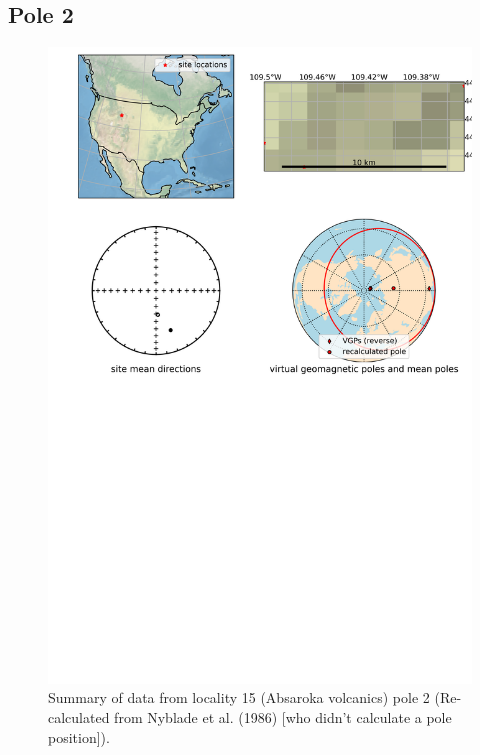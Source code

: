 \documentclass{article}
\begin{document}
\subsection{Pole 2}


\begin{figure}[H]
\centering
\includegraphics[width=5 in]{./15/2/pole_summary.png}
\caption{Summary of data from locality 15 (Absaroka volcanics) pole 2 (Re-calculated from Nyblade et al. (1986) [who didn't calculate a pole position]).}
\end{figure}
\end{document}
